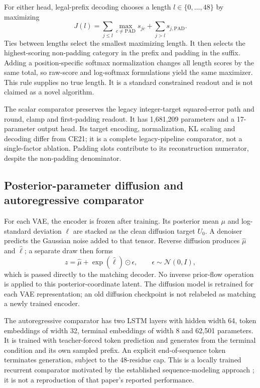 \documentclass[12pt,a4paper]{article}
\begin{document}
For either head, legal-prefix decoding chooses a length $l\in\{0,\ldots,48\}$ by maximizing
\begin{equation}
 J(l)=\sum_{j\leq l}\max_{c\ne\mathrm{PAD}}s_{jc}+\sum_{j>l}s_{j,\mathrm{PAD}}.
\end{equation}
Ties between lengths select the smallest maximizing length. It then selects the highest-scoring non-padding category in the prefix and padding in the suffix. Adding a position-specific softmax normalization changes all length scores by the same total, so raw-score and log-softmax formulations yield the same maximizer. This rule supplies no true length. It is a standard constrained readout and is not claimed as a novel algorithm.

The scalar comparator preserves the legacy integer-target squared-error path and round, clamp and first-padding readout. It has 1,681,209 parameters and a 17-parameter output head. Its target encoding, normalization, KL scaling and decoding differ from CE21; it is a complete legacy-pipeline comparator, not a single-factor ablation. Padding slots contribute to its reconstruction numerator, despite the non-padding denominator.

\subsection{Posterior-parameter diffusion and autoregressive comparator}
For each VAE, the encoder is frozen after training. Its posterior mean $\mu$ and log-standard deviation $\ell$ are stacked as the clean diffusion target $U_0$. A denoiser predicts the Gaussian noise added to that tensor. Reverse diffusion produces $\widehat\mu$ and $\widehat\ell$; a separate draw then forms
\begin{equation}
 z=\widehat\mu+\exp(\widehat\ell)\odot\epsilon,\qquad \epsilon\sim\mathcal N(0,I),
\end{equation}
which is passed directly to the matching decoder. No inverse prior-flow operation is applied to this posterior-coordinate latent. The diffusion model is retrained for each VAE representation; an old diffusion checkpoint is not relabeled as matching a newly trained encoder.

The autoregressive comparator has two LSTM layers with hidden width 64, token embeddings of width 32, terminal embeddings of width 8 and 62,501 parameters. It is trained with teacher-forced token prediction and generates from the terminal condition and its own sampled prefix. An explicit end-of-sequence token terminates generation, subject to the 48-residue cap. This is a locally trained recurrent comparator motivated by the established sequence-modeling approach \citep{muller2018}; it is not a reproduction of that paper's reported performance.
\end{document}
